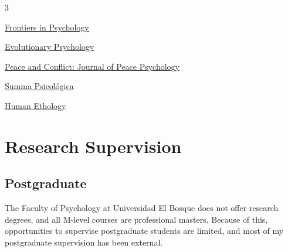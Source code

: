 \documentclass[11pt,a4paper,]{awesome-cv}
\begin{document}
\begin{cventries}
{\begin{cvitems}
\begin{multicols}{3}
\item \href{https://www.frontiersin.org/journals/psychology}{Frontiers in Psychology}
\item \href{https://journals.sagepub.com/home/evp}{Evolutionary Psychology}
\item \href{https://www.apa.org/pubs/journals/pac}{Peace and Conflict: Journal of \newline Peace Psychology}
\item \href{http://sumapsicologica.konradlorenz.edu.co/}{Summa Psicológica}
\item \href{https://ishe.org/human-ethology/}{Human Ethology}
\end{multicols}
\end{cvitems}}
\end{cventries}

\section{Research Supervision}\label{research-supervision}

\subsection{\texorpdfstring{\textbf{Postgraduate}}{}}\label{section-8}

The Faculty of Psychology at Universidad El Bosque does not offer
research degrees, and all M-level courses are professional masters.
Because of this, opportunities to supervise postgraduate students are
limited, and most of my postgraduate supervision has been external.
\end{document}
